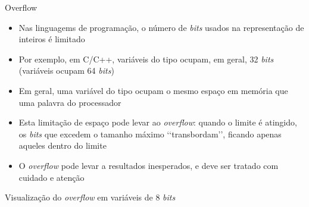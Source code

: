 \begin{frame}[fragile]{Overflow}

    \begin{itemize}
        \item Nas linguagems de programação, o número de \textit{bits} usados na representação
            de inteiros é limitado

        \item Por exemplo, em C/C++, variáveis do tipo   ocupam, em geral, 
            32 \textit{bits} (variáveis  ocupam 64 \textit{bits})

        \item Em geral, uma variável do tipo  ocupam o mesmo espaço em memória
            que uma palavra do processador

        \item Esta limitação de espaço pode levar ao \textit{overflow}: quando o limite é 
            atingido, os \textit{bits} que excedem o tamanho máximo \lq\lq transbordam\rq\rq,
            ficando apenas aqueles dentro do limite

        \item O \textit{overflow} pode levar a resultados inesperados, e deve ser tratado com
            cuidado e atenção

    \end{itemize}

\end{frame}

\begin{frame}[fragile]{Visualização do \textit{overflow} em variáveis de 8 \textit{bits}} 


\end{frame}

